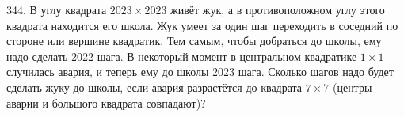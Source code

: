 344. В углу квадрата $2023\times2023$ живёт жук, а в противоположном углу этого квадрата находится его школа. Жук умеет за один шаг переходить в соседний по стороне или вершине квадратик. Тем самым, чтобы добраться до школы, ему надо сделать 2022 шага. В некоторый момент в центральном квадратике $1\times1$ случилась авария, и теперь ему до школы 2023 шага. Сколько шагов надо будет сделать жуку до школы, если авария разрастётся до квадрата $7\times7$ (центры аварии и большого квадрата совпадают)?\newpage\noindent

